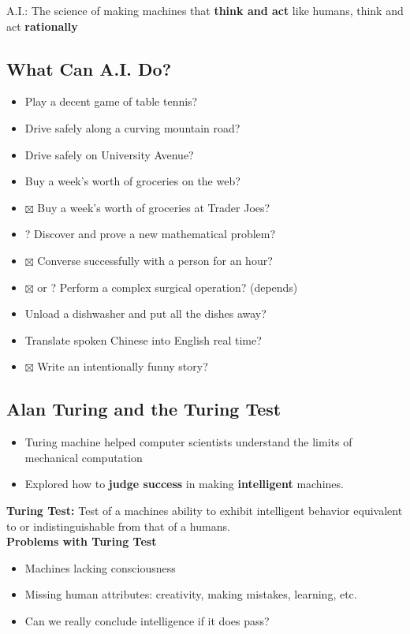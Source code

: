 \documentclass{article}
\begin{document}
A.I.: The science of making machines that \textbf{think and act} like humans, think and act \textbf{rationally} \\

\subsection{What Can A.I. Do?}
\begin{itemize}
    \item \checkmark Play a decent game of table tennis? 
    \item \checkmark Drive safely along a curving mountain road?
    \item \checkmark Drive safely on University Avenue?
    \item \checkmark Buy a week's worth of groceries on the web?
    \item $\boxtimes$ Buy a week's worth of groceries at Trader Joes? 
    \item ? Discover and prove a new mathematical problem? 
    \item $\boxtimes$ Converse successfully with a person for an hour?
    \item $\boxtimes$ or ? Perform a complex surgical operation? (depends)
    \item \checkmark Unload a dishwasher and put all the dishes away?
    \item \checkmark Translate spoken Chinese into English real time?
    \item $\boxtimes$ Write an intentionally funny story?
\end{itemize}

\subsection{Alan Turing and the Turing Test}

\begin{itemize}
    \item Turing machine helped computer scientists understand the limits of mechanical computation
    \item Explored how to \textbf{judge success} in making \textbf{intelligent} machines.
\end{itemize}

\noindent \textbf{Turing Test:} Test of a machines ability to exhibit intelligent behavior equivalent to or indistinguishable from that of a humans. \\

\noindent \textbf{Problems with Turing Test}
\begin{itemize}
    \item Machines lacking consciousness
    \item Missing human attributes: creativity, making mistakes, learning, etc. 
    \item Can we really conclude intelligence if it does pass?
\end{itemize}
\end{document}
